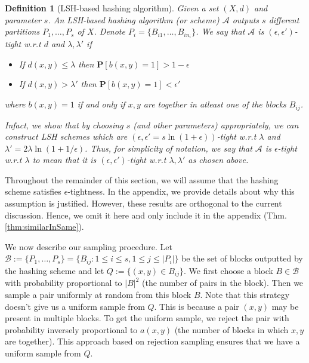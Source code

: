 \documentclass[12pt]{article}
\newtheorem{definition}[theorem]{Definition}
\newcommand{\mb}{\mathbf}
\newcommand{\mc}{\mathcal}
\begin{document}
\begin{definition}[LSH-based hashing algorithm]
\label{defn:LSHProperty}
Given a set $(X, d)$ and parameter $s$. An LSH-based hashing algorithm (or scheme) $\mc A$ outputs $s$ different partitions $P_1, \ldots, P_s$ of $X$. Denote $P_i = \{B_{i1}, \ldots, B_{in_i}\}$. We say that $\mc A$ is $(\epsilon, \epsilon')$-tight w.r.t $d$ and $\lambda, \lambda'$ if 

\begin{itemize}
	\item If $d(x, y) \le \lambda$ then  ${\mb P} [ b(x, y) = 1 ]  >  1 - \epsilon$
	\item If $d(x, y) > \lambda'$ then ${\mb P} [ b(x, y) = 1 ] < \epsilon'$
\end{itemize}
where $b(x, y) = 1$ if and only if $x, y$ are together in atleast one of the blocks $B_{ij}$.

Infact, we show that by choosing $s$ (and other parameters) appropriately, we can construct LSH schemes which are $(\epsilon, \epsilon'=s\ln (1+\epsilon))$-tight w.r.t $\lambda$ and $\lambda' = 2\lambda \ln (1+1/\epsilon)$. Thus, for simplicity of notation, we say that $\mc A$ is $\epsilon$-tight w.r.t $\lambda$ to mean that it is $(\epsilon, \epsilon')$-tight w.r.t $\lambda, \lambda'$ as chosen above.
\end{definition}

\noindent Throughout the remainder of this section, we will assume that the hashing scheme satisfies $\epsilon$-tightness. In the appendix, we provide details about why this assumption is justified. However, these results are orthogonal to the current discussion. Hence, we omit it here and only include it in the appendix (Thm. \ref{thm:similarInSame}).  

We now describe our sampling procedure. Let $\mc B := \{P_1, \ldots, P_s\} = \{B_{ij} : 1\le i\le s, 1\le j \le |P_i|\}$ be the set of blocks outputted by the hashing scheme and let $Q := \{(x, y) \in B_{ij}\}$.  We first choose a block $B \in \mc B$ with probability proportional to $|B|^2$ (the number of pairs in the block). Then we sample a pair uniformly at random from this block $B$. Note that this strategy doesn't give us a uniform sample from $Q$. This is because a pair $(x, y)$ may be present in multiple blocks. To get the uniform sample, we reject the pair with probability inversely proportional to $a(x, y)$ (the number of blocks in which $x, y$ are together). This approach based on rejection sampling ensures that we have a uniform sample from $Q$. 
\end{document}

